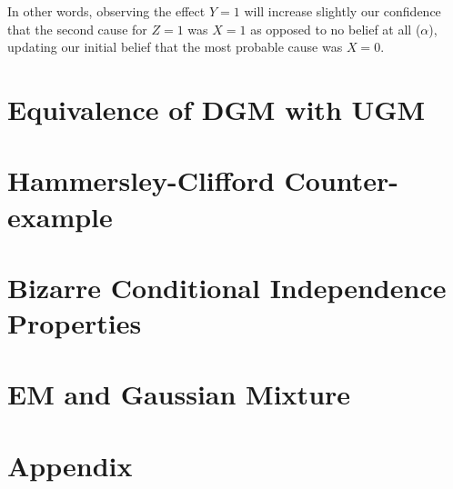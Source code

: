 \documentclass{article}
\numberwithin{equation}{section}
\begin{document}
In other words, observing the effect $Y = 1$ will increase slightly our confidence 
that the second cause for $Z = 1$ was $X = 1$ as opposed to no belief at all 
($\alpha$), updating our initial belief that the 
most probable cause was $X = 0$.


\section{Equivalence of DGM with UGM}

\section{Hammersley-Clifford Counter-example}

\section{Bizarre Conditional Independence Properties}

\section{EM and Gaussian Mixture}



\section{Appendix}
\end{document}
